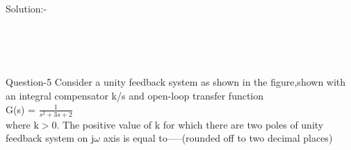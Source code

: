 \documentclass[journal,12pt,twocolumn]{IEEEtran}
\begin{document}
\begin{frame}{Solution:- }
\\\\\\
\begin{frame}{Question-5 }
     {Consider a unity feedback system as shown in the figure,shown with an integral compensator k/s and open-loop transfer function} \\
G(s) = $\frac{1}{s^2+3s+2}$
\\
    where k$>$0. The positive value of k for which there are two poles of unity feedback system on j${\omega}$ {axis is equal to-----(rounded off to two decimal places)}
 

\end{frame}
\end{frame}
\end{document}
